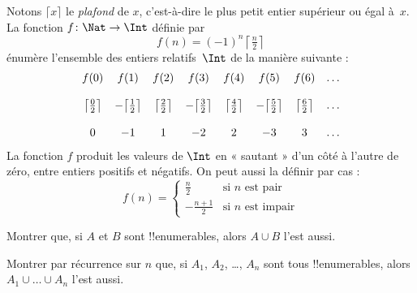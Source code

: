 \documentclass[../../../include/open-logic-section]{subfiles}
\begin{document}
\begin{ex}
Notons $\lceil x \rceil$ le \emph{plafond} de $x$, c'est-à-dire
le plus petit entier supérieur ou égal à~$x$. La fonction
$f \colon \Nat \to \Int$ définie par
\[
  f(n) = (-1)^{n} \left\lceil\tfrac{n}{2}\right\rceil
\]
énumère l'ensemble des entiers relatifs~$\Int$ de la manière suivante :
\[
\begin{array}{c c c c c c c c}
f(0) & f(1) & f(2) & f(3) & f(4) & f(5) & f(6) & \dots \\ \\
\big\lceil \tfrac{0}{2} \big\rceil & -\big\lceil \tfrac{1}{2}\big\rceil &  \big\lceil \tfrac{2}{2} \big\rceil & -\big\lceil \tfrac{3}{2} \big\rceil & \big\lceil \tfrac{4}{2} \big\rceil  & -\big\lceil \tfrac{5}{2}\big\rceil & \big\lceil \tfrac{6}{2} \big\rceil & \dots \\ \\
0 & -1 & 1 & -2 & 2 & -3 & 3& \dots
\end{array}
\]
La fonction $f$ produit les valeurs de $\Int$ en « sautant »
d'un côté à l'autre de zéro, entre entiers positifs et négatifs.
On peut aussi la définir par cas :
\[
f(n) = \begin{cases}
  \frac{n}{2} & \text{si $n$ est pair}\\
  -\frac{n+1}{2} & \text{si $n$ est impair}
  \end{cases}
\]
\end{ex}

\begin{prob}
Montrer que, si $A$ et $B$ sont !!{enumerable}s, alors
$A \cup B$ l'est aussi.
\end{prob}

\begin{prob}
Montrer par récurrence sur $n$ que, si $A_1$, $A_2$, \dots,
$A_n$ sont tous !!{enumerable}s, alors $A_1 \cup \dots \cup A_n$
l'est aussi.
\end{prob}
\end{document}
